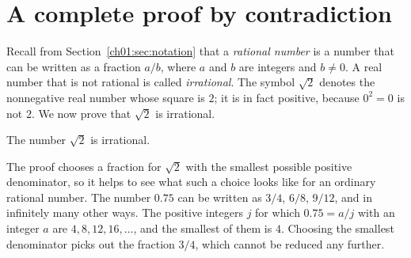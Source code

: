\section{A complete proof by contradiction}\label{ch04:sec:sqrt2}
Recall from Section~\ref{ch01:sec:notation} that a \emph{rational number} is a number that can be written as a fraction $a/b$, where $a$ and $b$ are integers and $b\ne0$. A real number that is not rational is called \emph{irrational}. The symbol $\sqrt2$ denotes the nonnegative real number whose square is $2$; it is in fact positive, because $0^2=0$ is not $2$. We now prove that $\sqrt2$ is irrational.

\par\noindent\begin{minipage}{\linewidth}
\begin{theorem}\label{thm:sqrt2}
The number $\sqrt2$ is irrational.
\end{theorem}
\end{minipage}\par

The proof chooses a fraction for $\sqrt2$ with the smallest possible positive denominator, so it helps to see what such a choice looks like for an ordinary rational number. The number $0.75$ can be written as $3/4$, $6/8$, $9/12$, and in infinitely many other ways. The positive integers $j$ for which $0.75=a/j$ with an integer $a$ are $4,8,12,16,\ldots$, and the smallest of them is $4$. Choosing the smallest denominator picks out the fraction $3/4$, which cannot be reduced any further.

